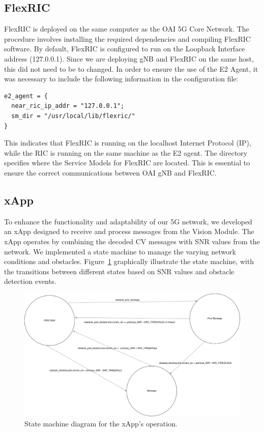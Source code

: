 \subsection{FlexRIC}\label{subsec:flexric}
FlexRIC is deployed on the same computer as the OAI 5G Core Network.
The procedure involves installing the required dependencies and compiling FlexRIC software.
By default, FlexRIC is configured to run on the Loopback Interface address (127.0.0.1).
Since we are deploying gNB and FlexRIC on the same host, this did not need to be to changed.
In order to ensure the use of the E2 Agent, it was necessary to include the following information in the configuration file:

\begin{verbatim}
e2_agent = {
  near_ric_ip_addr = "127.0.0.1";
  sm_dir = "/usr/local/lib/flexric/"
}
\end{verbatim}

This indicates that FlexRIC is running on the localhost Internet Protocol (IP), while the RIC is running on the same machine as the E2 agent.
The directory specifies where the Service Models for FlexRIC are located.
This is essential to ensure the correct communications between OAI gNB and FlexRIC\@.

\subsection{xApp}\label{subsec:xapp}
To enhance the functionality and adaptability of our 5G network, we developed an xApp designed to receive and process messages from the Vision Module.
The xApp operates by combining the decoded CV messages with SNR values from the network.
We implemented a state machine to manage the varying network conditions and obstacles.
Figure~\ref{fig:state_xapp} graphically illustrate the state machine, with the transitions between different states based on SNR values and obstacle detection events.

\begin{figure}[H]
    \centering
    \includegraphics[width=0.7\linewidth]{figures/State_machine.drawio}
    \caption{State machine diagram for the xApp's operation.}
    \label{fig:state_xapp}
\end{figure}


